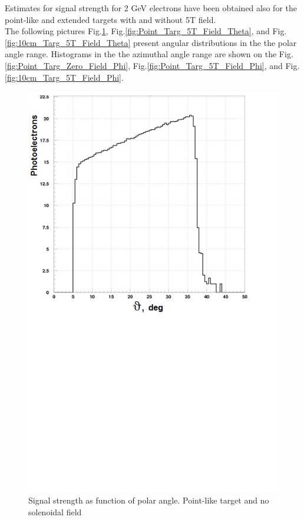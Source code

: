 Estimates for signal strength for 2 GeV electrons have been obtained also for the point-like and extended targets with and without 5T field.\\
\indent The following pictures 
Fig.\ref{fig:Point_Targ_Zero_Field_Theta}, 
Fig.\ref{fig:Point_Targ_5T_Field_Theta}, and 
Fig.\ref{fig:10cm_Targ_5T_Field_Theta} 
present angular distributions in the the polar angle range. Histograms  in the the azimuthal angle range are shown on the 
Fig.\ref{fig:Point_Targ_Zero_Field_Phi}, 
Fig.\ref{fig:Point_Targ_5T_Field_Phi}, and 
Fig.\ref{fig:10cm_Targ_5T_Field_Phi}. 

\begin{figure}[!ht]
    \centering
    \includegraphics[width=1.0\linewidth,trim={0.0cm 9.4cm 0.0cm 0.0cm},clip]{images/Point_Targ_Zero_Field_Theta.jpg}
    \caption{Signal strength as function of polar angle. Point-like target and no solenoidal field}
    \label{fig:Point_Targ_Zero_Field_Theta}
\end{figure}

